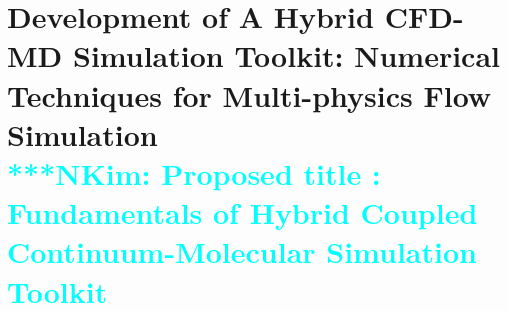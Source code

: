 \documentclass[preprint,12pt]{elsarticle}
\newcommand{\Nkimnote}[1]{ {\textcolor{cyan} { ***NKim: #1 }}}
\newcommand{\Nkimnote}[1]{}
\begin{document}





\section{Development of A Hybrid CFD-MD Simulation Toolkit: Numerical Techniques for Multi-physics Flow Simulation
\\
\Nkimnote{Proposed title : Fundamentals of Hybrid Coupled Continuum-Molecular Simulation Toolkit}}
\end{document}
